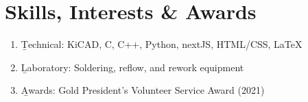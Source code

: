 \documentclass[11pt]{article}
\begin{document}
\section{Skills, Interests \& Awards}
\begin{enumerate}[itemsep=0pt]
  \item \b{Technical}: KiCAD, C, C++, Python, nextJS, HTML/CSS, LaTeX
  \item \b{Laboratory}: Soldering, reflow, and rework equipment 
  \item \b{Awards}: Gold President's Volunteer Service Award (2021)
\end{enumerate}
\end{document}
